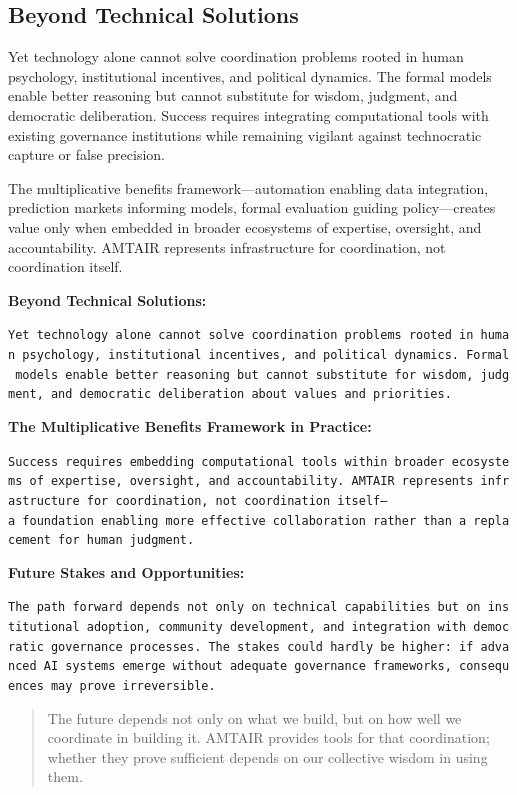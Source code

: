 \documentclass[
  11pt,
  letterpaper,
]{book}
\begin{document}
\subsection{Beyond Technical Solutions}\label{sec-beyond-technical}

Yet technology alone cannot solve coordination problems rooted in human
psychology, institutional incentives, and political dynamics. The formal
models enable better reasoning but cannot substitute for wisdom,
judgment, and democratic deliberation. Success requires integrating
computational tools with existing governance institutions while
remaining vigilant against technocratic capture or false precision.

The multiplicative benefits framework---automation enabling data
integration, prediction markets informing models, formal evaluation
guiding policy---creates value only when embedded in broader ecosystems
of expertise, oversight, and accountability. AMTAIR represents
infrastructure for coordination, not coordination itself.

\textbf{Beyond Technical Solutions:}

\texttt{Yet\ technology\ alone\ cannot\ solve\ coordination\ problems\ rooted\ in\ human\ psychology,\ institutional\ incentives,\ and\ political\ dynamics.\ Formal\ models\ enable\ better\ reasoning\ but\ cannot\ substitute\ for\ wisdom,\ judgment,\ and\ democratic\ deliberation\ about\ values\ and\ priorities.}

\textbf{The Multiplicative Benefits Framework in Practice:}

\texttt{Success\ requires\ embedding\ computational\ tools\ within\ broader\ ecosystems\ of\ expertise,\ oversight,\ and\ accountability.\ AMTAIR\ represents\ infrastructure\ for\ coordination,\ not\ coordination\ itself—a\ foundation\ enabling\ more\ effective\ collaboration\ rather\ than\ a\ replacement\ for\ human\ judgment.}

\textbf{Future Stakes and Opportunities:}

\texttt{The\ path\ forward\ depends\ not\ only\ on\ technical\ capabilities\ but\ on\ institutional\ adoption,\ community\ development,\ and\ integration\ with\ democratic\ governance\ processes.\ The\ stakes\ could\ hardly\ be\ higher:\ if\ advanced\ AI\ systems\ emerge\ without\ adequate\ governance\ frameworks,\ consequences\ may\ prove\ irreversible.}

\begin{quote}
The future depends not only on what we build, but on how well we
coordinate in building it. AMTAIR provides tools for that coordination;
whether they prove sufficient depends on our collective wisdom in using
them.
\end{quote}
\end{document}
